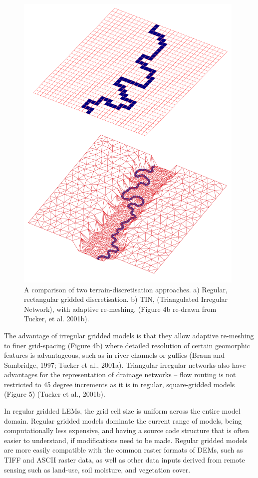 \begin{figure}[t]
\includegraphics[width=11cm]{LEMFinalRevisedmanuscriptDAVFinalrevisions-img/LEMFinalRevisedmanuscriptDAVFinalrevisions-img005.png} 
\caption{A comparison of two terrain-discretisation approaches. a) Regular, rectangular gridded discretisation. b) TIN, (Triangulated Irregular Network), with adaptive re-meshing. (Figure 4b re-drawn from Tucker, et al. 2001b).}
\label{fig_LEM_discretisation}
\end{figure}

The advantage of irregular gridded models is that they allow adaptive re-meshing to finer grid-spacing (Figure 4b) where detailed resolution of certain geomorphic features is advantageous, such as in river channels or gullies (Braun and Sambridge, 1997; Tucker et al., 2001a). Triangular irregular networks also have advantages for the representation of drainage networks – flow routing is not restricted to 45 degree increments as it is in regular, square-gridded models (Figure 5) (Tucker et al., 2001b).

In regular gridded LEMs, the grid cell size is uniform across the entire model domain. Regular gridded models dominate the current range of models, being computationally less expensive, and having a source code structure that is often easier to understand, if modifications need to be made. Regular gridded models are more easily compatible with the common raster formats of DEMs, such as TIFF and ASCII raster data, as well as other data inputs derived from remote sensing such as land-use, soil moisture, and vegetation cover.

